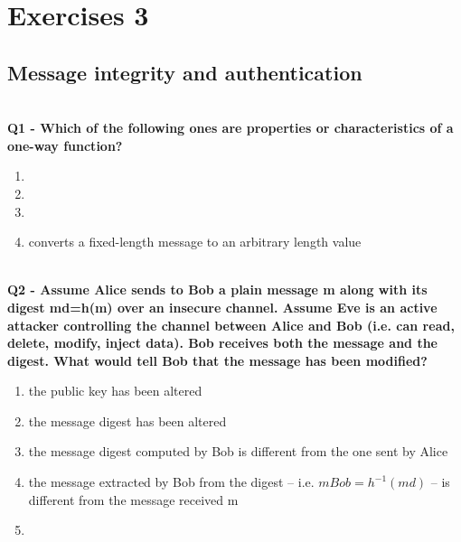 \chapter{Exercises 3}

\section{Message integrity and authentication}

\textbf{\\Q1 - Which of the following ones are properties or characteristics of a one-way function?}
\begin{enumerate}
	\item[A.] 
	\item[B.] 
	\item[C.] 
	\item[D.] converts a fixed-length message to an arbitrary length value
\end{enumerate}

\textbf{\\Q2 - Assume Alice sends to Bob a plain message m along with its digest md=h(m) over an insecure channel. Assume Eve is an active attacker controlling the channel between Alice and Bob (i.e. can read, delete, modify, inject data). Bob receives both the message and the digest. What would tell Bob that the message has been modified?}
\begin{enumerate}
	\item[A.] the public key has been altered
	\item[B.] the message digest has been altered
	\item[C.] the message digest computed by Bob is different from the one sent by Alice
	\item[D.] the message extracted by Bob from the digest – i.e. $mBob=h^{-1}(md)$ – is different from the message received m
	\item[E.] 
\end{enumerate}


